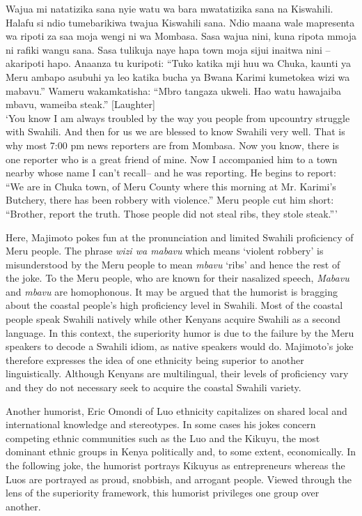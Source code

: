 \documentclass[output=paper]{langsci/langscibook}
\begin{document}
\ea
 Wajua mi natatizika sana nyie watu wa bara mwatatizika sana na Kiswahili. Halafu si ndio tumebarikiwa twajua Kiswahili sana. Ndio maana wale mapresenta wa ripoti za saa moja wengi ni wa Mombasa. Sasa wajua nini, kuna ripota mmoja ni rafiki wangu sana. Sasa tulikuja naye hapa town moja sijui inaitwa nini – akaripoti hapo. Anaanza tu kuripoti: “Tuko katika mji huu wa Chuka, kaunti ya Meru ambapo asubuhi ya leo katika bucha ya Bwana Karimi kumetokea wizi wa mabavu.” Wameru wakamkatisha: “Mbro tangaza ukweli. Hao watu hawajaiba mbavu, wameiba steak.” \textup{[Laughter]} \\
\glt ‘You know I am always troubled by the way you people from upcountry struggle with Swahili. And then for us we are blessed to know Swahili very well. That is why most 7:00 pm news reporters are from Mombasa. Now you know, there is one reporter who is a great friend of mine. Now I accompanied him to a town nearby whose name I can’t recall– and he was reporting. He begins to report: “We are in Chuka town, of Meru County where this morning at Mr. Karimi’s Butchery, there has been robbery with violence.” Meru people cut him short: “Brother, report the truth. Those people did not steal ribs, they stole steak.”’ \citep{Churchill2015Wajua}
\z

Here, Majimoto pokes fun at the pronunciation and limited Swahili proficiency of Meru people. The phrase \textit{wizi wa mabavu} which means ‘violent robbery’ is misunderstood by the Meru people to mean \textit{mbavu} ‘ribs’ and hence the rest of the joke. To the Meru people, who are known for their nasalized speech, \textit{Mabavu} and \textit{mbavu} are homophonous. It may be argued that the humorist is bragging about the coastal people’s high proficiency level in Swahili. Most of the coastal people speak Swahili natively while other Kenyans acquire Swahili as a second language. In this context, the superiority humor is due to the failure by the Meru speakers to decode a Swahili idiom, as native speakers would do. Majimoto’s joke therefore expresses the idea of one ethnicity being superior to another linguistically. Although Kenyans are multilingual, their levels of proficiency vary and they do not necessary seek to acquire the coastal Swahili variety.

Another humorist, Eric Omondi of Luo ethnicity capitalizes on shared local and international knowledge and stereotypes. In some cases his jokes concern competing ethnic communities such as the Luo and the Kikuyu, the most dominant ethnic groups in Kenya politically and, to some extent, economically. In the following joke, the humorist portrays Kikuyus as entrepreneurs whereas the Luos are portrayed as proud, snobbish, and arrogant people. Viewed through the lens of the superiority framework, this humorist privileges one group over another. 
 
\end{document}
